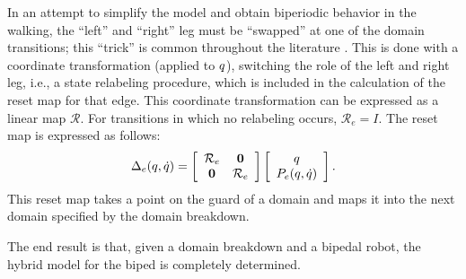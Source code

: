 In an attempt to simplify the model and obtain biperiodic behavior in the
walking, the ``left'' and ``right'' leg must be ``swapped'' at one of the domain
transitions;
%
this ``trick'' is common throughout the literature \cite{Grizzle2001}.
%
This is done with a coordinate transformation (applied to $q$), switching the
role of the left and right leg, i.e., a state relabeling procedure, which is
included in the calculation of the reset map for that edge.
%
This coordinate transformation can be expressed as a linear map $\mathcal{R}$.
%
For transitions in which no relabeling occurs, $\mathcal{R}_{e} = I$.
%
The reset map is expressed as follows:
%
\begin{align*}
  \Delta_{e}(q, \dot{q}) =
  \left[\begin{array}{c c}
      \mathcal{R}_{e} & {\mathbf 0}\\
      {\mathbf 0} & \mathcal{R}_{e}
    \end{array} \right]
  \left[\begin{array}{c}
      q\\
      P_{e}(q, \dot{q})
    \end{array} \right].
\end{align*}
%
This reset map takes a point on the guard of a domain and maps it into the next
domain specified by the domain breakdown.

The end result is that, given a domain breakdown and a bipedal robot, the hybrid
model for the biped is completely determined.
%
